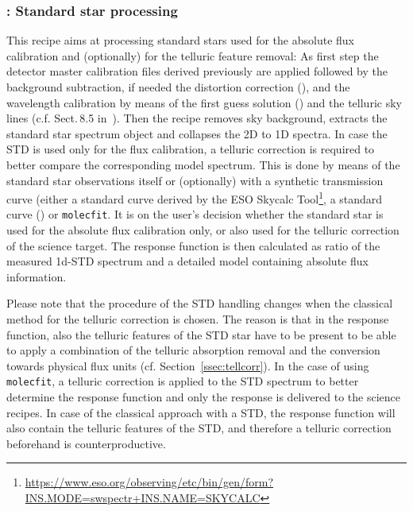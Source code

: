 \clearpage

\subsubsection{:  Standard star processing}\label{rec:metis_n_lss_std}
This recipe aims at processing standard stars used for the absolute flux calibration and (optionally) for the telluric feature removal: As first step the detector master calibration files derived previously are applied followed by the background subtraction, if needed the distortion correction (), and
the wavelength calibration by means of the first guess solution () and the telluric sky lines (c.f. Sect.\,8.5 in~\cite{DRLS}). Then the recipe removes sky background, extracts the standard star spectrum object and collapses the 2D to 1D spectra. In case the \ac{STD} is used only for the flux calibration, a telluric correction is required to better compare the corresponding model spectrum. This is done by means of the standard star observations itself or (optionally) with a synthetic transmission curve (either a standard curve derived by the ESO Skycalc Tool\footnote{\url{https://www.eso.org/observing/etc/bin/gen/form?INS.MODE=swspectr+INS.NAME=SKYCALC}}, a standard curve () or \texttt{molecfit}. It is on the user's decision whether the standard star is used for the absolute flux calibration only, or also used for the telluric correction of the science target. The response function is then calculated as ratio of the measured 1d-\ac{STD} spectrum and a detailed model containing absolute flux information.

Please note that the procedure of the \ac{STD} handling changes when the classical method for the telluric correction is chosen. The reason is that in the response function, also the telluric features of the \ac{STD} star have to be present to be able to apply a combination of the telluric absorption removal and the conversion towards physical flux units (cf. Section~\ref{ssec:tellcorr}). In the case of using \texttt{molecfit}, a telluric correction is applied to the \ac{STD} spectrum to better determine the response function and only the response is delivered to the science recipes. In case of the classical approach with a \ac{STD}, the response function will also contain the telluric features of the \ac{STD}, and therefore a telluric correction beforehand is counterproductive.\\

